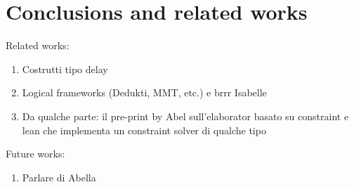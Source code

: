 \documentclass{easychair}
\begin{document}
\section{Conclusions and related works}\label{sec:conclusion}
Related works:
\begin{enumerate}
\item Costrutti tipo delay
\item Logical frameworks (Dedukti, MMT, etc.) e brrr Isabelle
\item Da qualche parte: il pre-print by Abel sull'elaborator basato su
 constraint e lean che implementa un constraint solver di qualche tipo
\end{enumerate}

Future works:
\begin{enumerate}
\item Parlare di Abella
\end{enumerate}

\label{sect:bib}


\end{document}
